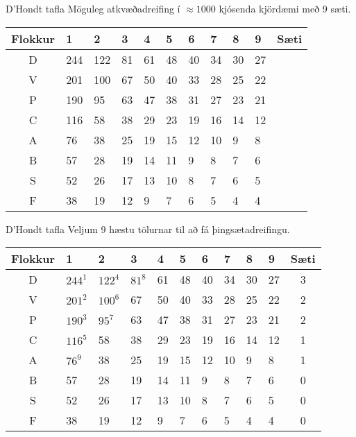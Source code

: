 \documentclass{beamer}
\begin{document}
\begin{frame}{D'Hondt tafla}
    Möguleg atkvæðadreifing í $\approx 1000$ kjósenda kjördæmi með 9 sæti.
    \begin{center}
        \begin{tabular}{cllllllllll}
            \toprule
            Flokkur&1&2&3&4&5&6&7&8&9&Sæti\\
            \midrule
            D&244& 122& 81& 61& 48& 40& 34& 30& 27&\\
            V&201& 100& 67& 50& 40& 33& 28& 25& 22&\\
            P&190&  95& 63& 47& 38& 31& 27& 23& 21&\\
            C&116&  58& 38& 29& 23& 19& 16& 14& 12&\\
            A& 76&  38& 25& 19& 15& 12& 10&  9&  8&\\
            B& 57&  28& 19& 14& 11&  9&  8&  7&  6&\\
            S& 52&  26& 17& 13& 10&  8&  7&  6&  5&\\
            F& 38&  19& 12&  9&  7&  6&  5&  4&  4&\\            
            \bottomrule
        \end{tabular}
    \end{center}
\end{frame}

\begin{frame}{D'Hondt tafla}
    Veljum 9 hæstu tölurnar til að fá þingsætadreifingu.
    \begin{center}
        \begin{tabular}{clllllllllc}
            \toprule
            Flokkur&1&2&3&4&5&6&7&8&9&Sæti\\
            \midrule
            D&\textbf{$244^1$}& \textbf{$122^4$}& \textbf{$81^8$}& 61& 48& 40& 34& 30& 27&3\\
            V&\textbf{$201^2$}& \textbf{$100^6$}& 67& 50& 40& 33& 28& 25& 22&2\\
            P&\textbf{$190^3$}& \textbf{$95^7$}& 63& 47& 38& 31& 27& 23& 21&2\\
            C&\textbf{$116^5$}&  58& 38& 29& 23& 19& 16& 14& 12&1\\
            A&\textbf{$76^9$}&  38& 25& 19& 15& 12& 10&  9&  8&1\\
            B& 57&  28& 19& 14& 11&  9&  8&  7&  6&0\\
            S& 52&  26& 17& 13& 10&  8&  7&  6&  5&0\\
            F& 38&  19& 12&  9&  7&  6&  5&  4&  4&0\\
                        
            \bottomrule
        \end{tabular}
    \end{center}
\end{frame}
\end{document}
